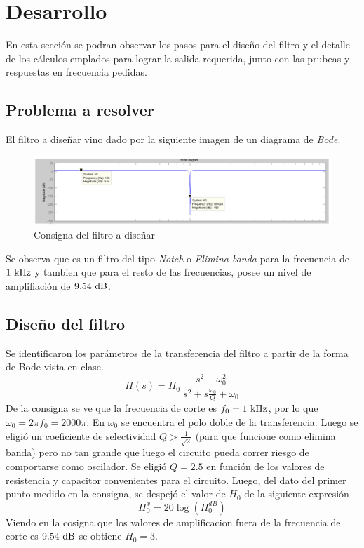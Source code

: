 \section*{Desarrollo}
En esta secci\'on se podran observar los pasos para el diseño del filtro y el detalle de los c\'alculos emplados para lograr la salida requerida, junto con las prubeas y respuestas en frecuencia pedidas.\\


\subsection*{Problema a resolver}
El filtro a diseñar vino dado por la siguiente imagen de un diagrama de \textit{Bode}. \\
\begin{figure}[H]
	\centering
	\includegraphics[width=15cm]{imagenes/consigna}
	\caption{Consigna del filtro a diseñar}
	\label{img:consigna}
\end{figure}

Se observa que es un filtro del tipo \textit{Notch} o \textit{Elimina banda} para la frecuencia de $1\ \si{\kilo\hertz}$ y tambien que para el resto de las frecuencias, posee un nivel de amplifiaci\'on de $9.54\dB$.

\subsection*{Diseño del filtro}
Se identificaron los par\'ametros de la transferencia del filtro a partir de la forma de Bode vista en clase.\\

\begin{equation}
  H(s)=H_0\ \frac{s^2 + \omega_0 ^2}{s^2 +s \frac{\omega_0}{Q} +\omega_0}
\end{equation}
De la  consigna se ve que la frecuencia de corte es $f_0 = 1\ \si{\kilo\hertz}$, por lo que $\omega_0 = 2\pi f_0= 2000\pi$. En $\omega_0$ se encuentra el polo doble de la transferencia.
Luego se eligi\'o un coeficiente de selectividad $Q > \frac{1}{\sqrt 2}$ (para que funcione como elimina banda) pero no tan grande que luego el circuito pueda correr riesgo de comportarse como oscilador. Se eligi\'o $Q= 2.5$ en funci\'on de los valores de resistencia y capacitor convenientes para el circuito.
Luego, del dato del primer punto medido en la consigna, se despej\'o el valor de $H_0$ de la siguiente expresi\'on
\begin{equation}
  H_0^x = 20 \log (H_0^{dB})
\end{equation}
Viendo en la cosigna que los valores de amplificacion fuera de la frecuencia de corte es $9.54 \dB$ se obtiene $H_0 = 3 $.

